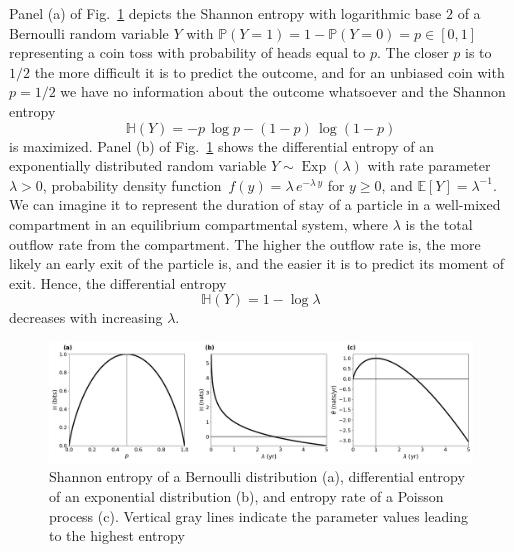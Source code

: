 \documentclass[smallextended]{svjour3}
\renewcommand{\P}{\mathbb{P}}
\newcommand{\E}{\mathbb{E}}
\renewcommand{\H}{\mathbb{H}}
\newcommand{\Exp}{\operatorname{Exp}}
\newcommand{\pdf}{probability density function}
\begin{document}
Panel (a) of Fig.~\ref{fig:simple_entropy} depicts the Shannon entropy with logarithmic base $2$ of a Bernoulli random variable $Y$ with $\P(Y=1)=1-\P(Y=0)=p\in[0,1]$ representing a coin toss with probability of heads equal to $p$.
The closer $p$ is to $1/2$ the more difficult it is to predict the outcome, and for an unbiased coin with $p=1/2$ we have no information about the outcome whatsoever and the Shannon entropy
\begin{equation}
	\H(Y) = -p\,\log p - (1-p)\,\log(1-p)
\end{equation}
is maximized.
Panel (b) of Fig.~\ref{fig:simple_entropy} shows the differential entropy of an exponentially distributed random variable $Y\sim\Exp(\lambda)$ with rate parameter $\lambda>0$, \pdf\ $f(y) = \lambda\,e^{-\lambda\,y}$ for $y\geq0$, and $\E\left[Y\right]=\lambda^{-1}$.
We can imagine it to represent the duration of stay of a particle in a well-mixed compartment in an equilibrium compartmental system, where $\lambda$ is the total outflow rate from the compartment.
The higher the outflow rate is, the more likely an early exit of the particle is, and the easier it is to predict its moment of exit.
Hence, the differential entropy 
\begin{equation}
	\H(Y) = 1-\log\lambda
\end{equation}
decreases with increasing $\lambda$.

\begin{figure}[htbp]
  \vspace{-0.6cm}
  \centering
  \includegraphics[width=1.0\linewidth]{figs/simple_entropy_py.png}
  \caption{
  Shannon entropy of a Bernoulli distribution (a), differential entropy of an exponential distribution (b), and entropy rate of a Poisson process (c).
  Vertical gray lines indicate the parameter values leading to the highest entropy
  }
  \label{fig:simple_entropy}
\end{figure}
\end{document}
